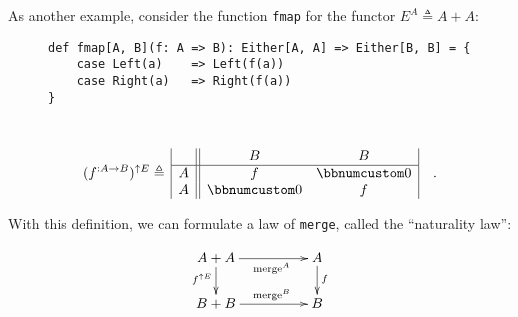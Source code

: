 As another example, consider the function \lstinline!fmap! for the
functor $E^{A}\triangleq A+A$:

\begin{wrapfigure}{L}{0.6\columnwidth}%
\vspace{-0.8\baselineskip}
\begin{lstlisting}
def fmap[A, B](f: A => B): Either[A, A] => Either[B, B] = {
    case Left(a)    => Left(f(a))
    case Right(a)   => Right(f(a))
}
\end{lstlisting}

\vspace{-1.65\baselineskip}
\end{wrapfigure}%

~\vspace{-1.45\baselineskip}
\[
(f^{:A\rightarrow B})^{\uparrow E}\triangleq\,\begin{array}{|c||cc|}
 & B & B\\
\hline A & f & \bbnum 0\\
A & \bbnum 0 & f
\end{array}\quad.
\]
\vspace{-0.7\baselineskip}

With this definition, we can formulate a law of \lstinline!merge!,
called the \textsf{``}naturality law\textsf{''}:

\begin{wrapfigure}{L}{0.3\columnwidth}%
\vspace{-2\baselineskip}
\[
\xymatrix{\xyScaleY{1.6pc}\xyScaleX{4.0pc}A+A\ar[d]\sb(0.45){f^{\uparrow E}}\ar[r]\sb(0.55){\text{merge}^{A}} & A\ar[d]\sp(0.45){f}\\
B+B\ar[r]\sp(0.55){\text{merge}^{B}} & B
}
\]
\vspace{-0.1\baselineskip}
\end{wrapfigure}%

